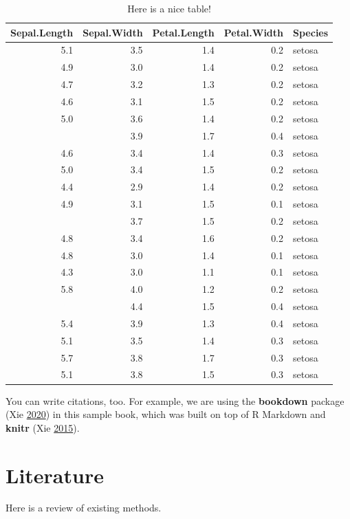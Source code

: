 \documentclass[
]{book}
\begin{document}
\begin{table}

\caption{\label{tab:nice-tab}Here is a nice table!}
\centering
\begin{tabular}[t]{rrrrl}
\toprule
Sepal.Length & Sepal.Width & Petal.Length & Petal.Width & Species\\
\midrule
5.1 & 3.5 & 1.4 & 0.2 & setosa\\
4.9 & 3.0 & 1.4 & 0.2 & setosa\\
4.7 & 3.2 & 1.3 & 0.2 & setosa\\
4.6 & 3.1 & 1.5 & 0.2 & setosa\\
5.0 & 3.6 & 1.4 & 0.2 & setosa\\
\addlinespace
5.4 & 3.9 & 1.7 & 0.4 & setosa\\
4.6 & 3.4 & 1.4 & 0.3 & setosa\\
5.0 & 3.4 & 1.5 & 0.2 & setosa\\
4.4 & 2.9 & 1.4 & 0.2 & setosa\\
4.9 & 3.1 & 1.5 & 0.1 & setosa\\
\addlinespace
5.4 & 3.7 & 1.5 & 0.2 & setosa\\
4.8 & 3.4 & 1.6 & 0.2 & setosa\\
4.8 & 3.0 & 1.4 & 0.1 & setosa\\
4.3 & 3.0 & 1.1 & 0.1 & setosa\\
5.8 & 4.0 & 1.2 & 0.2 & setosa\\
\addlinespace
5.7 & 4.4 & 1.5 & 0.4 & setosa\\
5.4 & 3.9 & 1.3 & 0.4 & setosa\\
5.1 & 3.5 & 1.4 & 0.3 & setosa\\
5.7 & 3.8 & 1.7 & 0.3 & setosa\\
5.1 & 3.8 & 1.5 & 0.3 & setosa\\
\bottomrule
\end{tabular}
\end{table}

You can write citations, too. For example, we are using the \textbf{bookdown} package (Xie \protect\hyperlink{ref-R-bookdown}{2020}) in this sample book, which was built on top of R Markdown and \textbf{knitr} (Xie \protect\hyperlink{ref-xie2015}{2015}).

\hypertarget{literature}{%
\chapter{Literature}\label{literature}}

Here is a review of existing methods.
\end{document}
